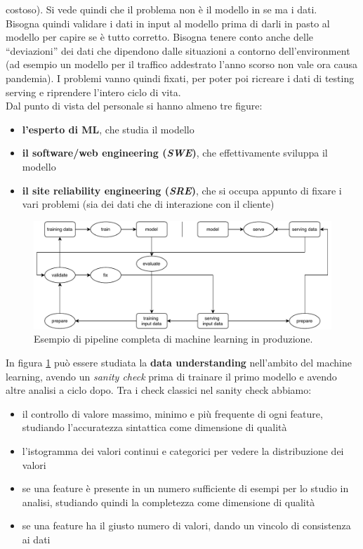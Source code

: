 \documentclass[a4paper,12pt, oneside]{book}
\begin{document}
costoso). Si vede quindi che il problema non è il modello in se ma i dati.\\
Bisogna quindi validare i dati in input al modello prima di darli in pasto al
modello per capire se è tutto corretto. Bisogna tenere conto anche delle
``deviazioni'' dei dati che dipendono dalle situazioni a contorno
dell'environment (ad esempio un modello per il traffico addestrato l'anno scorso
non vale ora causa pandemia). I problemi vanno quindi fixati, per poter poi
ricreare i dati di testing  serving e riprendere l'intero ciclo di vita.\\
Dal punto di vista del personale si hanno almeno tre figure:
\begin{itemize}
  \item \textbf{l'esperto di ML}, che studia il modello
  \item \textbf{il software/web engineering (\textit{SWE})}, che effettivamente
  sviluppa il modello
  \item \textbf{il site reliability engineering (\textit{SRE})}, che si occupa
  appunto di fixare i vari problemi (sia dei dati che di interazione con il
  cliente) 
\end{itemize}
\begin{figure}
  \centering
  \includegraphics[scale = 0.65]{img/pipe.pdf}
  \caption{Esempio di pipeline completa di machine learning in produzione.}
  \label{fig:pipe}
\end{figure}
In figura \ref{fig:pipe} può essere studiata la \textbf{data understanding}
nell'ambito del machine learning, avendo un \textit{sanity check} prima di
trainare il primo modello e avendo altre analisi a ciclo dopo. Tra i check
classici nel sanity check abbiamo:
\begin{itemize}
  \item il controllo di valore massimo, minimo e più frequente di ogni feature,
  studiando l'accuratezza sintattica come dimensione di qualità
  \item l'istogramma dei valori continui e categorici per vedere la
  distribuzione dei valori 
  \item se una feature è presente in un numero sufficiente di esempi per lo
  studio in analisi, studiando quindi la completezza come dimensione di qualità
  \item se una feature ha il giusto numero di valori, dando un vincolo di
  consistenza ai dati
\end{itemize}
\end{document}
